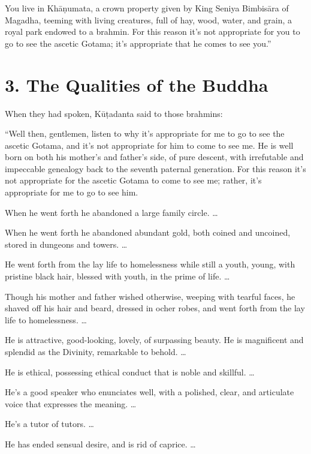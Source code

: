 \documentclass[12pt,openany]{book}%
\begin{document}
You live in \textsanskrit{Khāṇumata}, a crown property given by King Seniya \textsanskrit{Bimbisāra} of Magadha, teeming with living creatures, full of hay, wood, water, and grain, a royal park endowed to a brahmin. For this reason it’s not appropriate for you to go to see the ascetic Gotama; it’s appropriate that he comes to see you.” 

\section*{3. The Qualities of the Buddha }

When they had spoken, \textsanskrit{Kūṭadanta} said to those brahmins: 

“Well then, gentlemen, listen to why it’s appropriate for me to go to see the ascetic Gotama, and it’s not appropriate for him to come to see me. He is well born on both his mother’s and father’s side, of pure descent, with irrefutable and impeccable genealogy back to the seventh paternal generation. For this reason it’s not appropriate for the ascetic Gotama to come to see me; rather, it’s appropriate for me to go to see him. 

When he went forth he abandoned a large family circle. … 

When he went forth he abandoned abundant gold, both coined and uncoined, stored in dungeons and towers. … 

He went forth from the lay life to homelessness while still a youth, young, with pristine black hair, blessed with youth, in the prime of life. … 

Though his mother and father wished otherwise, weeping with tearful faces, he shaved off his hair and beard, dressed in ocher robes, and went forth from the lay life to homelessness. … 

He is attractive, good-looking, lovely, of surpassing beauty. He is magnificent and splendid as the Divinity, remarkable to behold. … 

He is ethical, possessing ethical conduct that is noble and skillful. … 

He’s a good speaker who enunciates well, with a polished, clear, and articulate voice that expresses the meaning. … 

He’s a tutor of tutors. … 

He has ended sensual desire, and is rid of caprice. … 
\end{document}
